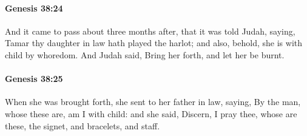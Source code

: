 		\paragraph{Genesis 38:24} %
			\label{GENESIS-38-24}

			And it came to pass about three months after, that it was told Judah, saying, Tamar thy daughter in law hath played the harlot; and also, behold, she is with child by whoredom. And Judah said, Bring her forth, and let her be burnt.


		\paragraph{Genesis 38:25} %
			\label{GENESIS-38-25}

			When she was brought forth, she sent to her father in law, saying, By the man, whose these are, am I with child: and she said, Discern, I pray thee, whose are these, the signet, and bracelets, and staff.

